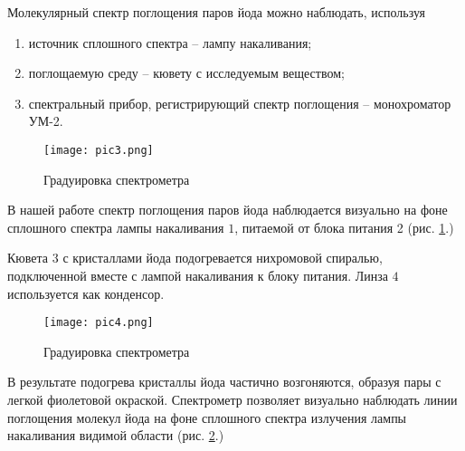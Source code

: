 Молекулярный спектр поглощения паров йода можно наблюдать, используя

\begin{enumerate}
  \item источник сплошного спектра -- лампу накаливания;
  \item поглощаемую среду -- кювету с исследуемым веществом;
  \item спектральный прибор, регистрирующий спектр поглощения -- монохроматор
  УМ-2.
\end{enumerate}

\begin{figure}[h!]
  \centering
  \texttt{[image: pic3.png]}
  \caption{Градуировка спектрометра}
  \label{pic3}
\end{figure}

В нашей работе спектр поглощения паров йода наблюдается визуально на фоне
сплошного спектра лампы накаливания $1$, питаемой от блока питания 2 (рис.
\ref{pic3}.)

Кювета $3$ с кристаллами йода подогревается нихромовой спиралью, подключенной
вместе с лампой накаливания к блоку питания. Линза $4$ используется как
конденсор.

\begin{figure}[h!]
  \centering
  \texttt{[image: pic4.png]}
  \caption{Градуировка спектрометра}
  \label{pic4}
\end{figure}

В результате подогрева кристаллы йода частично возгоняются, образуя пары с
легкой фиолетовой окраской. Спектрометр позволяет визуально наблюдать линии
поглощения молекул йода на фоне сплошного спектра излучения лампы накаливания
видимой области (рис. \ref{pic4}.)
